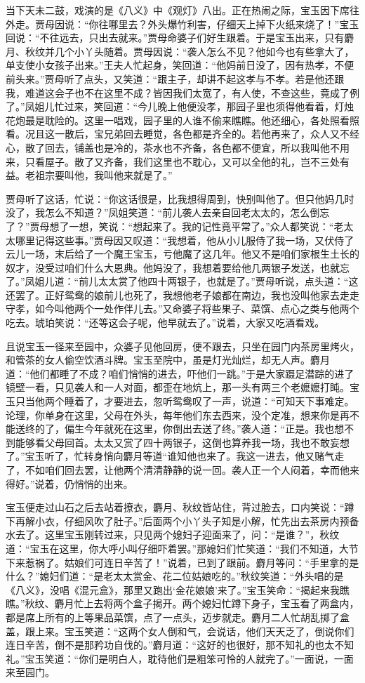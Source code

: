 \documentclass[12pt,oneside]{book}
\begin{document}
当下天未二鼓，戏演的是《八义》中《观灯》八出。正在热闹之际，宝玉因下席往外走。贾母因说：“你往哪里去？外头爆竹利害，仔细天上掉下火纸来烧了！”宝玉回说：“不往远去，只出去就来。”贾母命婆子们好生跟着。于是宝玉出来，只有麝月、秋纹并几个小丫头随着。贾母因说：“袭人怎么不见？他如今也有些拿大了，单支使小女孩子出来。”王夫人忙起身，笑回道：“他妈前日没了，因有热孝，不便前头来。”贾母听了点头，又笑道：“跟主子，却讲不起这孝与不孝。若是他还跟我，难道这会子也不在这里不成？皆因我们太宽了，有人使，不查这些，竟成了例了。”凤姐儿忙过来，笑回道：“今儿晚上他便没孝，那园子里也须得他看着，灯烛花炮最是耽险的。这里一唱戏，园子里的人谁不偷来瞧瞧。他还细心，各处照看照看。况且这一散后，宝兄弟回去睡觉，各色都是齐全的。若他再来了，众人又不经心，散了回去，铺盖也是冷的，茶水也不齐备，各色都不便宜，所以我叫他不用来，只看屋子。散了又齐备，我们这里也不耽心，又可以全他的礼，岂不三处有益。老祖宗要叫他，我叫他来就是了。”

贾母听了这话，忙说：“你这话很是，比我想得周到，快别叫他了。但只他妈几时没了，我怎么不知道？”凤姐笑道：“前儿袭人去亲自回老太太的，怎么倒忘了？”贾母想了一想，笑说：“想起来了。我的记性竟平常了。”众人都笑说：“老太太哪里记得这些事。”贾母因又叹道：“我想着，他从小儿服侍了我一场，又伏侍了云儿一场，末后给了一个魔王宝玉，亏他魔了这几年。他又不是咱们家根生土长的奴才，没受过咱们什么大恩典。他妈没了，我想着要给他几两银子发送，也就忘了。”凤姐儿道：“前儿太太赏了他四十两银子，也就是了。”贾母听说，点头道：“这还罢了。正好鸳鸯的娘前儿也死了，我想他老子娘都在南边，我也没叫他家去走走守孝，如今叫他两个一处作伴儿去。”又命婆子将些果子、菜馔、点心之类与他两个吃去。琥珀笑说：“还等这会子呢，他早就去了。”说着，大家又吃酒看戏。

且说宝玉一径来至园中，众婆子见他回房，便不跟去，只坐在园门内茶房里烤火，和管茶的女人偷空饮酒斗牌。宝玉至院中，虽是灯光灿烂，却无人声。麝月道：“他们都睡了不成？咱们悄悄的进去，吓他们一跳。”于是大家蹑足潜踪的进了镜壁一看，只见袭人和一人对面，都歪在地炕上，那一头有两三个老嬷嬷打盹。宝玉只当他两个睡着了，才要进去，忽听鸳鸯叹了一声，说道：“可知天下事难定。论理，你单身在这里，父母在外头，每年他们东去西来，没个定准，想来你是再不能送终的了，偏生今年就死在这里，你倒出去送了终。”袭人道：“正是。我也想不到能够看父母回首。太太又赏了四十两银子，这倒也算养我一场，我也不敢妄想了。”宝玉听了，忙转身悄向麝月等道“谁知他也来了。我这一进去，他又赌气走了，不如咱们回去罢，让他两个清清静静的说一回。袭人正一个人闷着，幸而他来得好。”说着，仍悄悄的出来。

宝玉便走过山石之后去站着撩衣，麝月、秋纹皆站住，背过脸去，口内笑说：“蹲下再解小衣，仔细风吹了肚子。”后面两个小丫头子知是小解，忙先出去茶房内预备水去了。这里宝玉刚转过来，只见两个媳妇子迎面来了，问：“是谁？”，秋纹道：“宝玉在这里，你大呼小叫仔细吓着罢。”那媳妇们忙笑道：“我们不知道，大节下来惹祸了。姑娘们可连日辛苦了！”说着，已到了跟前。麝月等问：“手里拿的是什么？”媳妇们道：“是老太太赏金、花二位姑娘吃的。”秋纹笑道：“外头唱的是《八义》，没唱《混元盒》，那里又跑出‘金花娘娘’来了。”宝玉笑命：“揭起来我瞧瞧。”秋纹、麝月忙上去将两个盒子揭开。两个媳妇忙蹲下身子，宝玉看了两盒内，都是席上所有的上等果品菜馔，点了一点头，迈步就走。麝月二人忙胡乱掷了盒盖，跟上来。宝玉笑道：“这两个女人倒和气，会说话，他们天天乏了，倒说你们连日辛苦，倒不是那矜功自伐的。”麝月道：“这好的也很好，那不知礼的也太不知礼。”宝玉笑道：“你们是明白人，耽待他们是粗笨可怜的人就完了。”一面说，一面来至园门。
\end{document}
